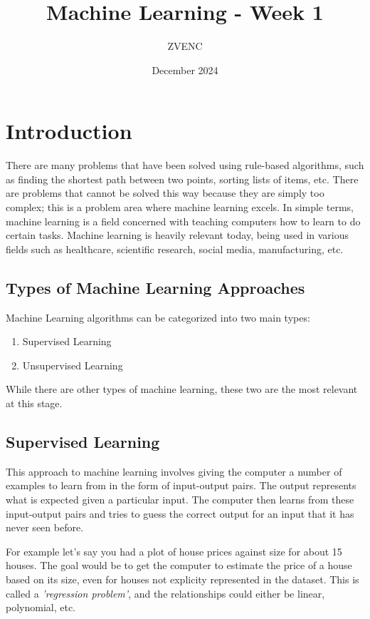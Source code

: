 \documentclass{article}
\title{Machine Learning - Week 1}
\author{ZVENC}
\date{December 2024}
\begin{document}
\maketitle


\section{Introduction}
There are many problems that have been solved using rule-based algorithms, such as finding the shortest path between two points, sorting lists of items, etc. There are problems that cannot be solved this way because they are simply too complex; this is a problem area where machine learning excels. In simple terms, machine learning is a field concerned with teaching computers how to learn to do certain tasks. Machine learning is heavily relevant today, being used in various fields such as healthcare, scientific research, social media, manufacturing, etc.

\subsection{Types of Machine Learning Approaches}
Machine Learning algorithms can be categorized into two main types:

\begin{enumerate}

\item Supervised Learning
\item Unsupervised Learning

\end{enumerate}

\noindent While there are other types of machine learning, these two are the most relevant at this stage.

\subsection{Supervised Learning}
This approach to machine learning involves giving the computer a number of examples to learn from in the form of input-output pairs. The output represents what is expected given a particular input. The computer then learns from these input-output pairs and tries to guess the correct output for an input that it has never seen before.

For example let's say you had a plot of house prices against size for about 15 houses. The goal would be to get the computer to estimate the price of a house based on its size, even for houses not explicity represented in the dataset. This is called a \textit{'regression problem'}, and the relationships could either be linear, polynomial, etc.
\end{document}
